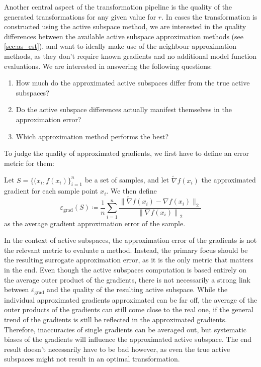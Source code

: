 \documentclass[
  a4paper,  %
  twoside,  %
  bibliography=totoc,
  headsepline,
  cleardoublepage=empty,
  parskip=half,
  draft=false
]{scrbook}
\begin{document}
Another central aspect of the transformation pipeline is the quality of the generated transformations for any given value for $r$.
In cases the transformation is constructed using the active subspace method, we are interested in the quality differences between the available active subspace approximation methods (see \cref{sec:as_est}), and want to ideally make use of the neighbour approximation methods, as they don't require known gradients and no additional model function evaluations.
We are interested in answering the following questions:
\begin{enumerate}
\item How much do the approximated active subspaces differ from the true active subspaces?
\item Do the active subspace differences actually manifest themselves in the approximation error?
\item Which approximation method performs the best?
\end{enumerate}
%
To judge the quality of approximated gradients, we first have to define an error metric for them:
\begin{definition}
Let $S=\{(x_i, f(x_i)\}_{i=1}^n$ be a set of samples, and let $\widetilde{\nabla} f(x_i)$ the approximated gradient for each sample point $x_i$. We then define
\begin{equation}
\varepsilon_{\mathrm{grad}}(S) \coloneqq \frac{1}{n} \sum_{i=1}^n \frac{\|{\widetilde{\nabla} f(x_i) - \nabla f(x_i)}\|_2}{{\| \nabla f(x_i) \|}_2}
\label{eq:e_grad}
\end{equation}
as the average gradient approximation error of the sample.
\end{definition}
%
In the context of active subspaces, the approximation error of the gradients is not the relevant metric to evaluate a method.
Instead, the primary focus should be the resulting surrogate approximation error, as it is the only metric that matters in the end.
Even though the active subspaces computation is based entirely on the average outer product of the gradients, there is not necessarily a strong link between $\varepsilon_{\text{grad}}$ and the quality of the resulting active subspace.
While the individual approximated gradients approximated can be far off, the average of the outer products of the gradients can still come close to the real one, if the general trend of the gradients is still be reflected in the approximated gradients.
Therefore, inaccuracies of single gradients can be averaged out, but systematic biases of the gradients will influence the approximated active subspace.
The end result doesn't necessarily have to be bad however, as even the true active subspaces might not result in an optimal transformation.
\end{document}

